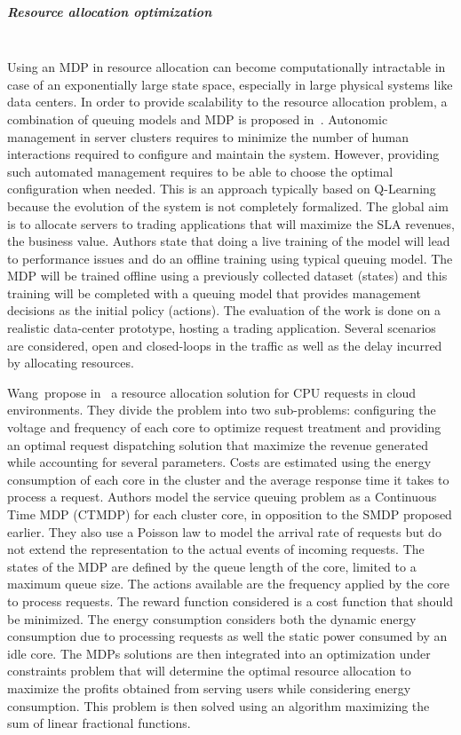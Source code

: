 \subparagraph{Resource allocation optimization}
\textbf{\\}
Using an MDP in resource allocation can become computationally intractable in case of an exponentially large state space, especially in large physical systems like data centers. In order to provide scalability to the resource allocation problem, a combination of queuing models and MDP is proposed in~\cite{Tesauro2006}.
Autonomic management in server clusters requires to minimize the number of human interactions required to configure and maintain the system.
However, providing such automated management requires to be able to choose the optimal configuration when needed.
This is an approach typically based on Q-Learning because the evolution of the system is not completely formalized.
The global aim is to allocate servers to trading applications that will maximize the SLA revenues, \ie the business value.
Authors state that doing a live training of the model will lead to performance issues and do an offline training using typical queuing model. The MDP will be trained offline using a previously collected dataset (states) and this training will be completed with a queuing model that provides management decisions as the initial policy (actions).
The evaluation of the work is done on a realistic data-center prototype, hosting a trading application. 
Several scenarios are considered, open and closed-loops in the traffic as well as the delay incurred by allocating resources.

Wang~\etal propose in~\cite{Wang2013} a resource allocation solution for CPU requests in cloud environments.
They divide the problem into two sub-problems: configuring the voltage and frequency of each core to optimize request treatment and providing an optimal request dispatching solution that maximize the revenue generated while accounting for several parameters.
Costs are estimated using the energy consumption of each core in the cluster and the average response time it takes to process a request.
Authors model the service queuing problem as a Continuous Time MDP (CTMDP) for each cluster core, in opposition to the SMDP proposed earlier.
They also use a Poisson law to model the arrival rate of requests but do not extend the representation to the actual events of incoming requests.
The states of the MDP are defined by the queue length of the core, limited to a maximum queue size. The actions available are the frequency applied by the core to process requests.
The reward function considered is a cost function that should be minimized.
The energy consumption considers both the dynamic energy consumption due to processing requests as well the static power consumed by an idle core.
The MDPs solutions are then integrated into an optimization under constraints problem that will determine the optimal resource allocation to maximize the profits obtained from serving users while considering energy consumption.
This problem is then solved using an algorithm maximizing the sum of linear fractional functions.


